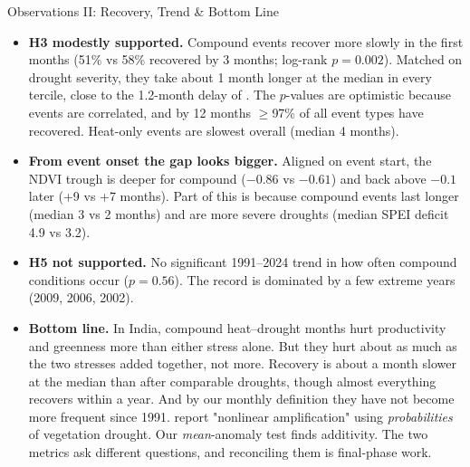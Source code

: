 \documentclass[12pt,aspectratio=169]{beamer}
\begin{document}
\begin{frame}{Observations II: Recovery, Trend \& Bottom Line}
  \scriptsize
  \begin{itemize}
    \item \textbf{H3 modestly supported.} Compound events recover more
      slowly in the first months (51\% vs 58\% recovered by 3 months;
      log-rank $p=0.002$). Matched on drought severity, they take about 1
      month longer at the median in every tercile, close to the 1.2-month
      delay of \citet{yao2024}. The $p$-values are optimistic because events
      are correlated, and by 12 months $\ge$97\% of all event types have
      recovered. Heat-only events are slowest overall (median 4 months).
    \item \textbf{From event onset the gap looks bigger.} Aligned on event
      start, the NDVI trough is deeper for compound ($-0.86$ vs $-0.61$) and
      back above $-0.1$ later (+9 vs +7 months). Part of this is because
      compound events last longer (median 3 vs 2 months) and are more severe
      droughts (median SPEI deficit 4.9 vs 3.2).
    \item \textbf{H5 not supported.} No significant 1991--2024 trend in how
      often compound conditions occur ($p=0.56$). The record is dominated by
      a few extreme years (2009, 2006, 2002).
    \item \textbf{Bottom line.} In India, compound heat--drought months hurt
      productivity and greenness more than either stress alone. But they
      hurt about as much as the two stresses added together, not more.
      Recovery is about a month slower at the median than after
      comparable droughts, though almost everything recovers within a year. And by our monthly definition they have not become more
      frequent since 1991.
      \citet{meena2026} report "nonlinear amplification" using
      \emph{probabilities} of vegetation drought. Our \emph{mean}-anomaly
      test finds additivity. The two metrics ask different questions, and
      reconciling them is final-phase work.
  \end{itemize}
\end{frame}
\end{document}
